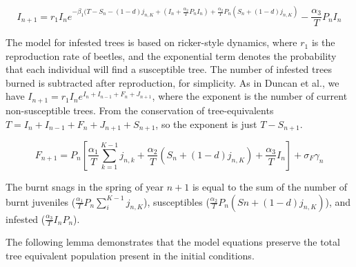 \begin{equation}
I_{n+1} = r_1 I_n e^{-\beta_1 (T - S_n - (1 - d) j_{n, K} + (I_n + \frac{\alpha_2}{T} P_n I_n) +  \frac{\alpha_2}{T} P_n \left( S_n + (1-d) j_{n, K}\right) } - \frac{\alpha_3}{T} P_n I_n
\end{equation}

The model for infested trees is based on ricker-style dynamics, where $r_1$ is the reproduction rate of beetles, and the exponential term denotes the probability that each individual will find a susceptible tree. The number of infested trees burned is subtracted after reproduction, for simplicity. As in Duncan et al., we have $I_{n+1} = r_1 I_n e^{I_n + I_{n-1} + F_n + J_{n+1}}$, where the exponent is the number of current non-susceptible trees. From the conservation of tree-equivalents $T = I_n + I_{n-1} + F_{n} + J_{n+1} + S_{n+1}$, so the exponent is just $T - S_{n+1}$.

\begin{equation}    
  F_{n+1} =  P_n \left[\frac{\alpha_1}{T} \sum_{k = 1}^{K-1} j_{n,k} + \frac{\alpha_2}{T}( S_n + (1 - d)j_{n,K}) + \frac{\alpha_3}{T}I_n\right] + \sigma_F\gamma_n 
\end{equation}

The burnt snags in the spring of year $n+1$ is equal to the sum of the number of burnt juveniles ($\frac{\alpha_1}{T} P_n \sum_i^{K-1} j_{n,K}$), susceptibles ($\frac{\alpha_2}{T}P_n(Sn  + (1-d) j_{n,K}) $), and infested ($ \frac{\alpha_3}{T}I_n P_n$).

The following lemma demonstrates that the model equations preserve the total tree equivalent population present in the initial conditions. 


